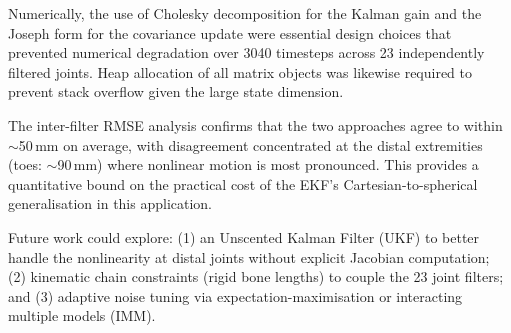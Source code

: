 \documentclass[12pt, a4paper]{article}
\begin{document}
Numerically, the use of Cholesky decomposition for the Kalman gain and the Joseph form for the covariance update were essential design choices that prevented numerical degradation over 3040 timesteps across 23 independently filtered joints. Heap allocation of all matrix objects was likewise required to prevent stack overflow given the large state dimension.

The inter-filter RMSE analysis confirms that the two approaches agree to within $\sim$50\,mm on average, with disagreement concentrated at the distal extremities (toes: $\sim$90\,mm) where nonlinear motion is most pronounced. This provides a quantitative bound on the practical cost of the EKF's Cartesian-to-spherical generalisation in this application.

Future work could explore: (1) an Unscented Kalman Filter (UKF) to better handle the nonlinearity at distal joints without explicit Jacobian computation; (2) kinematic chain constraints (rigid bone lengths) to couple the 23 joint filters; and (3) adaptive noise tuning via expectation-maximisation or interacting multiple models (IMM).

\end{document}
